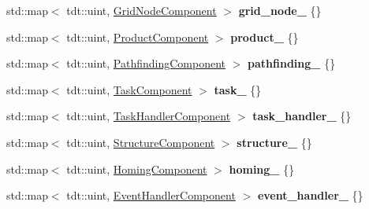 \begin{DoxyCompactItemize}
\item 
std\+::map$<$ tdt\+::uint, \hyperlink{struct_grid_node_component}{Grid\+Node\+Component} $>$ {\bfseries grid\+\_\+node\+\_\+} \{\}\hypertarget{class_entity_system_a80611774b556117f69ba3b0376dc0d6e}{}\label{class_entity_system_a80611774b556117f69ba3b0376dc0d6e}

\item 
std\+::map$<$ tdt\+::uint, \hyperlink{struct_product_component}{Product\+Component} $>$ {\bfseries product\+\_\+} \{\}\hypertarget{class_entity_system_a2fcd6980b698066b3c8d3ec039474bce}{}\label{class_entity_system_a2fcd6980b698066b3c8d3ec039474bce}

\item 
std\+::map$<$ tdt\+::uint, \hyperlink{struct_pathfinding_component}{Pathfinding\+Component} $>$ {\bfseries pathfinding\+\_\+} \{\}\hypertarget{class_entity_system_a8948d0cce621c20516541b1a3c6b8c9a}{}\label{class_entity_system_a8948d0cce621c20516541b1a3c6b8c9a}

\item 
std\+::map$<$ tdt\+::uint, \hyperlink{struct_task_component}{Task\+Component} $>$ {\bfseries task\+\_\+} \{\}\hypertarget{class_entity_system_adae3a93692d10e343fc476a59c574ccb}{}\label{class_entity_system_adae3a93692d10e343fc476a59c574ccb}

\item 
std\+::map$<$ tdt\+::uint, \hyperlink{struct_task_handler_component}{Task\+Handler\+Component} $>$ {\bfseries task\+\_\+handler\+\_\+} \{\}\hypertarget{class_entity_system_a238a118b5585f20f179089b4b0c422f2}{}\label{class_entity_system_a238a118b5585f20f179089b4b0c422f2}

\item 
std\+::map$<$ tdt\+::uint, \hyperlink{struct_structure_component}{Structure\+Component} $>$ {\bfseries structure\+\_\+} \{\}\hypertarget{class_entity_system_a3fd7a5df1c05aed80fd7acd7c72dfad6}{}\label{class_entity_system_a3fd7a5df1c05aed80fd7acd7c72dfad6}

\item 
std\+::map$<$ tdt\+::uint, \hyperlink{struct_homing_component}{Homing\+Component} $>$ {\bfseries homing\+\_\+} \{\}\hypertarget{class_entity_system_a60c125a3b5d21c07835db0ed74be0178}{}\label{class_entity_system_a60c125a3b5d21c07835db0ed74be0178}

\item 
std\+::map$<$ tdt\+::uint, \hyperlink{struct_event_handler_component}{Event\+Handler\+Component} $>$ {\bfseries event\+\_\+handler\+\_\+} \{\}\hypertarget{class_entity_system_ab435505f9b51d7f5a668ef98e853b5e1}{}\label{class_entity_system_ab435505f9b51d7f5a668ef98e853b5e1}


\end{DoxyCompactItemize}
